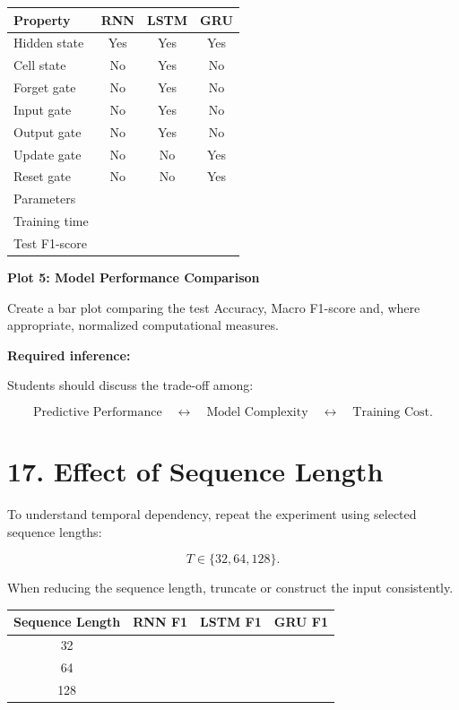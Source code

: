 \documentclass[10pt]{article}
\begin{document}
\begin{center}
\begin{tabular}{|l|c|c|c|}
\hline
Property & RNN & LSTM & GRU\\
\hline
Hidden state & Yes & Yes & Yes\\
Cell state & No & Yes & No\\
Forget gate & No & Yes & No\\
Input gate & No & Yes & No\\
Output gate & No & Yes & No\\
Update gate & No & No & Yes\\
Reset gate & No & No & Yes\\
Parameters & & &\\
Training time & & &\\
Test F1-score & & &\\
\hline
\end{tabular}
\end{center}

\textbf{Plot 5: Model Performance Comparison}

Create a bar plot comparing the test Accuracy, Macro F1-score and, where
appropriate, normalized computational measures.

\textbf{Required inference:}

Students should discuss the trade-off among:

\[
\text{Predictive Performance}
\quad\leftrightarrow\quad
\text{Model Complexity}
\quad\leftrightarrow\quad
\text{Training Cost}.
\]

\section*{17. Effect of Sequence Length}

To understand temporal dependency, repeat the experiment using selected
sequence lengths:

\[
T\in\{32,64,128\}.
\]

When reducing the sequence length, truncate or construct the input consistently.

\begin{center}
\begin{tabular}{|c|c|c|c|}
\hline
Sequence Length & RNN F1 & LSTM F1 & GRU F1\\
\hline
32 & & &\\
64 & & &\\
128 & & &\\
\hline
\end{tabular}
\end{center}
\end{document}
